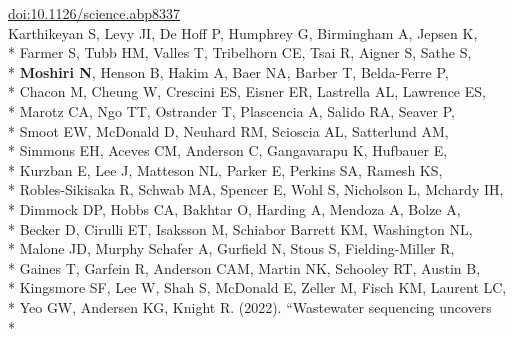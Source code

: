 \documentclass[margin,line]{res}
\begin{document}
\begin{resume}
\hspace*{8mm} \href{https://doi.org/10.1126/science.abp8337}{doi:10.1126/science.abp8337}\\
\hspace*{4mm} Karthikeyan S, Levy JI, De Hoff P, Humphrey G, Birmingham A, Jepsen K,\\*
\hspace*{9mm} Farmer S, Tubb HM, Valles T, Tribelhorn CE, Tsai R, Aigner S, Sathe S,\\*
\hspace*{9mm} \textbf{Moshiri N}, Henson B, Hakim A, Baer NA, Barber T, Belda-Ferre P,\\*
\hspace*{9mm} Chacon M, Cheung W, Crescini ES, Eisner ER, Lastrella AL, Lawrence ES,\\*
\hspace*{9mm} Marotz CA, Ngo TT, Ostrander T, Plascencia A, Salido RA, Seaver P,\\*
\hspace*{9mm} Smoot EW, McDonald D, Neuhard RM, Scioscia AL, Satterlund AM,\\*
\hspace*{9mm} Simmons EH, Aceves CM, Anderson C, Gangavarapu K, Hufbauer E,\\*
\hspace*{9mm} Kurzban E, Lee J, Matteson NL, Parker E, Perkins SA, Ramesh KS,\\*
\hspace*{9mm} Robles-Sikisaka R, Schwab MA, Spencer E, Wohl S, Nicholson L, Mchardy IH,\\*
\hspace*{9mm} Dimmock DP, Hobbs CA, Bakhtar O, Harding A, Mendoza A, Bolze A,\\*
\hspace*{9mm} Becker D, Cirulli ET, Isaksson M, Schiabor Barrett KM, Washington NL,\\*
\hspace*{9mm} Malone JD, Murphy Schafer A, Gurfield N, Stous S, Fielding-Miller R,\\*
\hspace*{9mm} Gaines T, Garfein R, Anderson CAM, Martin NK, Schooley RT, Austin B,\\*
\hspace*{9mm} Kingsmore SF, Lee W, Shah S, McDonald E, Zeller M, Fisch KM, Laurent LC,\\*
\hspace*{9mm} Yeo GW, Andersen KG, Knight R. (2022). ``Wastewater sequencing uncovers\\*

\end{resume}
\end{document}
